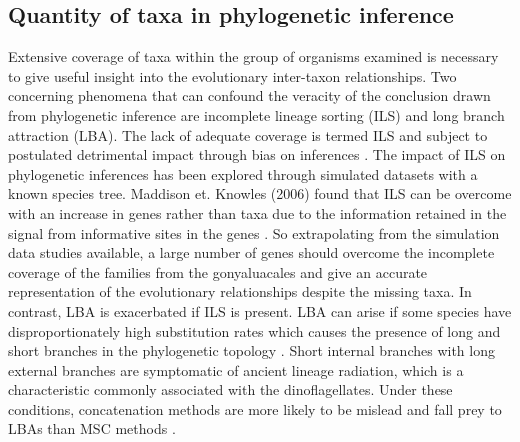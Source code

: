 \documentclass[12pt]{article}
\begin{document}
\subsection*{Quantity of taxa in phylogenetic inference}
Extensive coverage of taxa within the group of organisms examined is necessary to give useful insight into the evolutionary inter-taxon relationships.
Two concerning phenomena that can confound the veracity of the conclusion drawn from phylogenetic inference are incomplete lineage sorting (ILS) and long branch attraction (LBA). 
The lack of adequate coverage is termed ILS and subject to postulated detrimental impact through bias on inferences \cite{heath2008taxon}. 
The impact of ILS on phylogenetic inferences has been explored through simulated datasets with a known species tree. 
Maddison et. Knowles (2006) found that ILS can be overcome with an increase in genes rather than taxa due to the information retained in the signal from informative sites in the genes \cite{maddison2006inferring}. 
So extrapolating from the simulation data studies available, a large number of genes should overcome the incomplete coverage of the families from the gonyaluacales and give an accurate representation of the evolutionary relationships despite the missing taxa. 
In contrast, LBA is exacerbated if ILS is present. 
LBA can arise if some species have disproportionately high substitution rates which causes the presence of long and short branches in the phylogenetic topology \cite{liu2014coalescent}. 
Short internal branches with long external branches are symptomatic of ancient lineage radiation, which is a characteristic commonly associated with the dinoflagellates. 
Under these conditions, concatenation methods are more likely to be mislead and fall prey to LBAs than MSC methods \cite{liu2014coalescent}.
\end{document}
